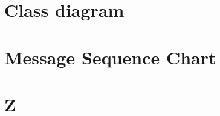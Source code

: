 \documentclass[a4paper,twoside,11pt]{article}
\begin{document}
\section{Class diagram}

\section{Message Sequence Chart}

\section{Z}
\end{document}
